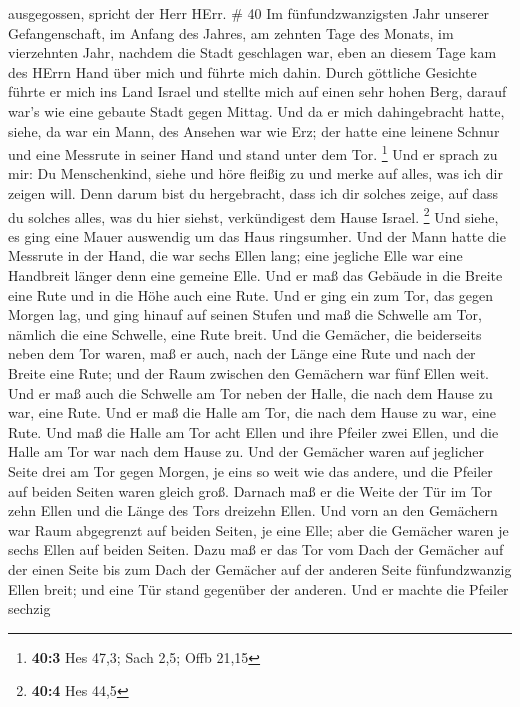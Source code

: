 ausgegossen, spricht der Herr HErr. \# 40  Im
fünfundzwanzigsten Jahr unserer Gefangenschaft, im Anfang des Jahres, am
zehnten Tage des Monats, im vierzehnten Jahr, nachdem die Stadt
geschlagen war, eben an diesem Tage kam des HErrn Hand über mich und
führte mich dahin.  Durch göttliche Gesichte führte er mich
ins Land Israel und stellte mich auf einen sehr hohen Berg, darauf war's
wie eine gebaute Stadt gegen Mittag.  Und da er mich
dahingebracht hatte, siehe, da war ein Mann, des Ansehen war wie Erz;
der hatte eine leinene Schnur und eine Messrute in seiner Hand und stand
unter dem Tor. \footnote{\textbf{40:3} Hes 47,3; Sach 2,5; Offb 21,15}
 Und er sprach zu mir: Du Menschenkind, siehe und höre
fleißig zu und merke auf alles, was ich dir zeigen will. Denn darum bist
du hergebracht, dass ich dir solches zeige, auf dass du solches alles,
was du hier siehst, verkündigest dem Hause Israel. \footnote{\textbf{40:4}
  Hes 44,5}  Und siehe, es ging eine Mauer auswendig um das
Haus ringsumher. Und der Mann hatte die Messrute in der Hand, die war
sechs Ellen lang; eine jegliche Elle war eine Handbreit länger denn eine
gemeine Elle. Und er maß das Gebäude in die Breite eine Rute und in die
Höhe auch eine Rute.  Und er ging ein zum Tor, das gegen
Morgen lag, und ging hinauf auf seinen Stufen und maß die Schwelle am
Tor, nämlich die eine Schwelle, eine Rute breit.  Und die
Gemächer, die beiderseits neben dem Tor waren, maß er auch, nach der
Länge eine Rute und nach der Breite eine Rute; und der Raum zwischen den
Gemächern war fünf Ellen weit. Und er maß auch die Schwelle am Tor neben
der Halle, die nach dem Hause zu war, eine Rute.  Und er maß
die Halle am Tor, die nach dem Hause zu war, eine Rute.  Und
maß die Halle am Tor acht Ellen und ihre Pfeiler zwei Ellen, und die
Halle am Tor war nach dem Hause zu.  Und der Gemächer waren
auf jeglicher Seite drei am Tor gegen Morgen, je eins so weit wie das
andere, und die Pfeiler auf beiden Seiten waren gleich groß.
 Darnach maß er die Weite der Tür im Tor zehn Ellen und die
Länge des Tors dreizehn Ellen.  Und vorn an den Gemächern
war Raum abgegrenzt auf beiden Seiten, je eine Elle; aber die Gemächer
waren je sechs Ellen auf beiden Seiten.  Dazu maß er das
Tor vom Dach der Gemächer auf der einen Seite bis zum Dach der Gemächer
auf der anderen Seite fünfundzwanzig Ellen breit; und eine Tür stand
gegenüber der anderen.  Und er machte die Pfeiler sechzig
